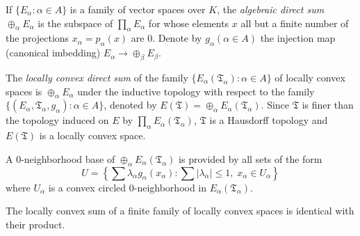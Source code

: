 If $\{E_\alpha : \alpha \in A\}$ is a family of vector spaces over $K$, the \textit{algebraic direct sum} $\oplus_\alpha E_\alpha$ is the subspace of $\prod_\alpha E_\alpha$ for whose elements $x$ all but a finite number of the projections $x_\alpha = p_\alpha(x)$ are $0$. Denote by $g_\alpha (\alpha \in A)$ the injection map (canonical imbedding) $E_\alpha \rightarrow \oplus_\beta E_\beta$.

The \textit{locally convex direct sum} of the family $\{E_\alpha(\mathfrak{T}_\alpha) : \alpha \in A\}$ of locally convex spaces is $\oplus_\alpha E_\alpha$ under the inductive topology with respect to the family $\{(E_\alpha, \mathfrak{T}_\alpha, g_\alpha) : \alpha \in A\}$, denoted by $E(\mathfrak{T}) = \oplus_\alpha E_\alpha(\mathfrak{T}_\alpha)$. Since $\mathfrak{T}$ is finer than the topology induced on $E$ by $\prod_\alpha E_\alpha(\mathfrak{T}_\alpha)$, $\mathfrak{T}$ is a Hausdorff topology and $E(\mathfrak{T})$ is a locally convex space.

A $0$-neighborhood base of $\oplus_\alpha E_\alpha(\mathfrak{T}_\alpha)$ is provided by all sets of the form
$$
U = \left\{ \sum \lambda_\alpha g_\alpha(x_\alpha) : \sum |\lambda_\alpha| \leq 1,\; x_\alpha \in U_\alpha \right\}
$$
where $U_\alpha$ is a convex circled $0$-neighborhood in $E_\alpha(\mathfrak{T}_\alpha)$.

The locally convex sum of a finite family of locally convex spaces is identical with their product.

